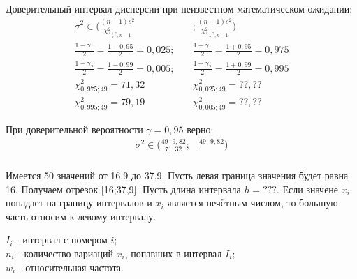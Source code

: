 \documentclass[utf8, a4paper, 14pt, russian, oneside]{book}
\begin{document}
Доверительный интервал дисперсии при неизвестном математическом ожидании:
\begin{align*}
    \sigma^2 \in \Bigg( \frac{(n-1)s^2}{\chi^2_{\tfrac{1+\gamma}{2},n-1}}&; \frac{(n-1)s^2}{\chi^2_{\tfrac{1-\gamma}{2},n-1}} \Bigg)\\
    \frac{1-\gamma_1}{2} = \frac{1 - 0,95}{2} = 0,025; \quad& \frac{1+\gamma_1}{2} = \frac{1+0,95}{2} = 0,975\\
    \frac{1-\gamma_2}{2} = \frac{1 - 0,99}{2} = 0,005; \quad& \frac{1+\gamma_2}{2} = \frac{1+0,99}{2} = 0,995\\
    \chi^2_{0,975;49} = 71,32 \qquad& \chi^2_{0,025;49} = ??,?? \\
    \chi^2_{0,995;49} = 79,19 \qquad& \chi^2_{0,005;49} = ??,??
\end{align*}

При доверительной вероятности $\gamma=0,95$ верно:
\begin{align*}
    \sigma^2 \in \Big( \frac{49 \cdot 9,82}{71,32}; & \frac{49 \cdot 9,82}{} \Big)\\
\end{align*}

\newpage

Имеется 50 значений от 16,9 до 37,9. Пусть левая граница значения будет равна 16. Получаем отрезок [16;37,9].
Пусть длина интервала $h=???$.
Если значене $x_i$ попадает на границу интервалов и $x_i$ является нечётным числом, то большую часть относим к левому интервалу.

$I_i$ - интервал с номером $i$;\\
$n_i$ - количество вариаций $x_i$, попавших в интервал $I_i$;\\
$w_i$ - относительная частота.


\newpage
\end{document}
